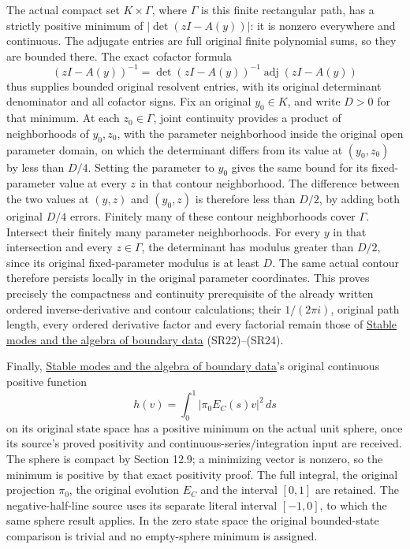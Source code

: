 \documentclass[
  11pt,
]{article}
\begin{document}
The actual compact set \(K\times\Gamma\), where \(\Gamma\) is this
finite rectangular path, has a strictly positive minimum of
\(|\det(zI-A(y))|\): it is nonzero everywhere and continuous. The
adjugate entries are full original finite polynomial sums, so they are
bounded there. The exact cofactor formula \[
(zI-A(y))^{-1}
=\det(zI-A(y))^{-1}\operatorname{adj}(zI-A(y))
\tag{RT44}
\] thus supplies bounded original resolvent entries, with its original
determinant denominator and all cofactor signs. Fix an original
\(y_0\in K\), and write \(D>0\) for that minimum. At each
\(z_0\in\Gamma\), joint continuity provides a product of neighborhoods
of \(y_0,z_0\), with the parameter neighborhood inside the original open
parameter domain, on which the determinant differs from its value at
\((y_0,z_0)\) by less than \(D/4\). Setting the parameter to \(y_0\)
gives the same bound for its fixed-parameter value at every \(z\) in
that contour neighborhood. The difference between the two values at
\((y,z)\) and \((y_0,z)\) is therefore less than \(D/2\), by adding both
original \(D/4\) errors. Finitely many of these contour neighborhoods
cover \(\Gamma\). Intersect their finitely many parameter neighborhoods.
For every \(y\) in that intersection and every \(z\in\Gamma\), the
determinant has modulus greater than \(D/2\), since its original
fixed-parameter modulus is at least \(D\). The same actual contour
therefore persists locally in the original parameter coordinates. This
proves precisely the compactness and continuity prerequisite of the
already written ordered inverse-derivative and contour calculations;
their \(1/(2\pi i)\), original path length, every ordered derivative
factor and every factorial remain those of
\href{stable-boundary-models.pdf}{Stable modes and the algebra of
boundary data} (SR22)--(SR24).

Finally, \href{stable-boundary-models.pdf}{Stable modes and the algebra
of boundary data}'s original continuous positive function \[
h(v)=\int_0^1|\pi_0E_C(s)v|^2\,ds
\tag{RT45}
\] on its original state space has a positive minimum on the actual unit
sphere, once its source's proved positivity and
continuous-series/integration input are received. The sphere is compact
by Section 12.9; a minimizing vector is nonzero, so the minimum is
positive by that exact positivity proof. The full integral, the original
projection \(\pi_0\), the original evolution \(E_C\) and the interval
\([0,1]\) are retained. The negative-half-line source uses its separate
literal interval \([-1,0]\), to which the same sphere result applies. In
the zero state space the original bounded-state comparison is trivial
and no empty-sphere minimum is assigned.
\end{document}

